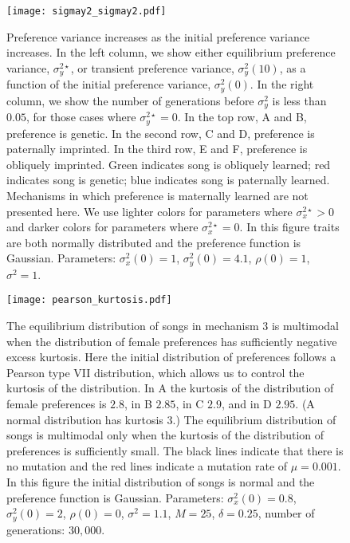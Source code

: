 \documentclass{article}
\begin{document}
\begin{figure}
\texttt{[image: sigmay2\_sigmay2.pdf]}
\caption{\label{sigmay2_sigmay2} Preference variance increases as the initial preference variance increases.  
In the left column, we show either equilibrium preference variance, $\sigma_y^{2\star}$, or transient preference variance, $\sigma_y^2(10)$, as a function of the initial preference variance, $\sigma_y^2(0)$. In the right column, we show the number of generations before $\sigma_y^2$ is less than $0.05$, for those cases where $\sigma_y^{2\star}=0$. In the top row, A and B, preference is genetic. In the second row, C and D, preference is paternally imprinted. In the third row, E and F, preference is obliquely imprinted. Green indicates song is obliquely learned; red indicates song is genetic; blue indicates song is paternally learned. Mechanisms in which preference is maternally learned are not presented here. We use lighter colors for parameters where $\sigma_x^{2\star}>0$ and darker colors for parameters where $\sigma_x^{2\star}=0$.  In this figure traits are both normally distributed and the preference function is Gaussian.  Parameters: $\sigma_x^2(0)=1$, $\sigma_y^2(0)=4.1$, $\rho(0)=1$, $\sigma^2=1$.}
\end{figure}


\begin{figure}
\texttt{[image: pearson\_kurtosis.pdf]}
\caption{\label{kurtosis} The equilibrium distribution of songs in mechanism 3 is multimodal when the distribution of female preferences has sufficiently negative excess kurtosis. Here the initial distribution of preferences follows a Pearson type VII distribution, which allows us to control the kurtosis of the distribution. In A the kurtosis of the distribution of female preferences is $2.8$, in B $2.85$, in C $2.9$, and in D $2.95$. (A normal distribution has kurtosis $3$.) The equilibrium distribution of songs is multimodal only when the kurtosis of the distribution of preferences is sufficiently small. The black lines indicate that there is no mutation and the red lines indicate a mutation rate of $\mu=0.001$. In this figure the initial distribution of songs is normal and the preference function is Gaussian.  Parameters: $\sigma_x^2(0)=0.8$, $\sigma_y^2(0)=2$, $\rho(0)=0$, $\sigma^2=1.1$, $M=25$, $\delta=0.25$, number of generations: $30,000$. 
}
\end{figure}
\end{document}
